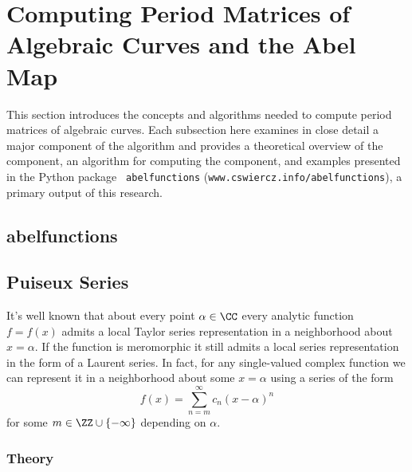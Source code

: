 \section{Computing Period Matrices of Algebraic Curves and the Abel Map}

This section introduces the concepts and algorithms needed to compute
period matrices of algebraic curves. Each subsection here examines in
close detail a major component of the algorithm and provides a
theoretical overview of the component, an algorithm for computing the
component, and examples presented in the Python package {\tt
  abelfunctions} ({\tt www.cswiercz.info/abelfunctions}), a primary
output of this research.

\subsection{abelfunctions}



\subsection{Puiseux Series}

It's well known that about every point $\alpha \in \CC$ every analytic
function $f = f(x)$ admits a local Taylor series representation in a
neighborhood about $x = \alpha$. If the function is meromorphic it still
admits a local series representation in the form of a Laurent series. In
fact, for any single-valued complex function we can represent it in a
neighborhood about some $x = \alpha$ using a series of the form
\[
    f(x) = \sum_{n=m}^\infty c_n (x-\alpha)^n
\]
for some $m \in \ZZ \cup \{-\infty\}$ depending on $\alpha$.

\subsubsection*{Theory}

